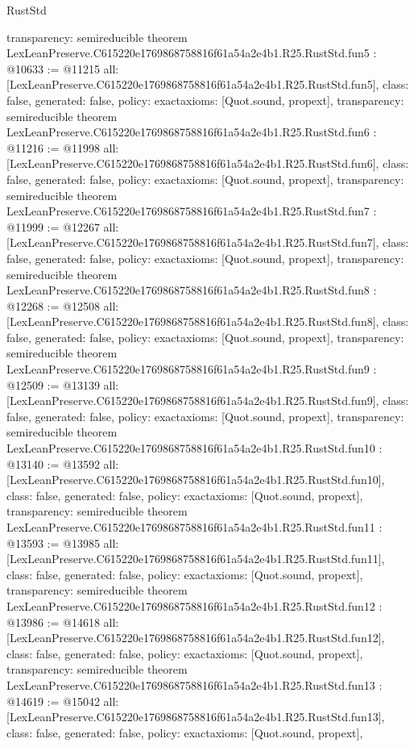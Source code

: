 \begin{lexlean}{RustStd}
\begin{coremodule}
{  transparency: semireducible
}
theorem LexLeanPreserve.C615220e1769868758816f61a54a2e4b1.R25.RustStd.fun5 : @10633 := @11215 {
  all: [LexLeanPreserve.C615220e1769868758816f61a54a2e4b1.R25.RustStd.fun5],
  class: false,
  generated: false,
  policy: exact{axioms: [Quot.sound, propext]},
  transparency: semireducible
}
theorem LexLeanPreserve.C615220e1769868758816f61a54a2e4b1.R25.RustStd.fun6 : @11216 := @11998 {
  all: [LexLeanPreserve.C615220e1769868758816f61a54a2e4b1.R25.RustStd.fun6],
  class: false,
  generated: false,
  policy: exact{axioms: [Quot.sound, propext]},
  transparency: semireducible
}
theorem LexLeanPreserve.C615220e1769868758816f61a54a2e4b1.R25.RustStd.fun7 : @11999 := @12267 {
  all: [LexLeanPreserve.C615220e1769868758816f61a54a2e4b1.R25.RustStd.fun7],
  class: false,
  generated: false,
  policy: exact{axioms: [Quot.sound, propext]},
  transparency: semireducible
}
theorem LexLeanPreserve.C615220e1769868758816f61a54a2e4b1.R25.RustStd.fun8 : @12268 := @12508 {
  all: [LexLeanPreserve.C615220e1769868758816f61a54a2e4b1.R25.RustStd.fun8],
  class: false,
  generated: false,
  policy: exact{axioms: [Quot.sound, propext]},
  transparency: semireducible
}
theorem LexLeanPreserve.C615220e1769868758816f61a54a2e4b1.R25.RustStd.fun9 : @12509 := @13139 {
  all: [LexLeanPreserve.C615220e1769868758816f61a54a2e4b1.R25.RustStd.fun9],
  class: false,
  generated: false,
  policy: exact{axioms: [Quot.sound, propext]},
  transparency: semireducible
}
theorem LexLeanPreserve.C615220e1769868758816f61a54a2e4b1.R25.RustStd.fun10 : @13140 := @13592 {
  all: [LexLeanPreserve.C615220e1769868758816f61a54a2e4b1.R25.RustStd.fun10],
  class: false,
  generated: false,
  policy: exact{axioms: [Quot.sound, propext]},
  transparency: semireducible
}
theorem LexLeanPreserve.C615220e1769868758816f61a54a2e4b1.R25.RustStd.fun11 : @13593 := @13985 {
  all: [LexLeanPreserve.C615220e1769868758816f61a54a2e4b1.R25.RustStd.fun11],
  class: false,
  generated: false,
  policy: exact{axioms: [Quot.sound, propext]},
  transparency: semireducible
}
theorem LexLeanPreserve.C615220e1769868758816f61a54a2e4b1.R25.RustStd.fun12 : @13986 := @14618 {
  all: [LexLeanPreserve.C615220e1769868758816f61a54a2e4b1.R25.RustStd.fun12],
  class: false,
  generated: false,
  policy: exact{axioms: [Quot.sound, propext]},
  transparency: semireducible
}
theorem LexLeanPreserve.C615220e1769868758816f61a54a2e4b1.R25.RustStd.fun13 : @14619 := @15042 {
  all: [LexLeanPreserve.C615220e1769868758816f61a54a2e4b1.R25.RustStd.fun13],
  class: false,
  generated: false,
  policy: exact{axioms: [Quot.sound, propext]},
}
\end{coremodule}
\end{lexlean}
